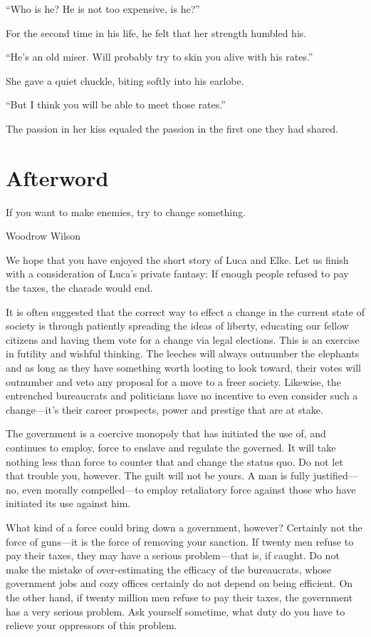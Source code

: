 ``Who is he? He is not too expensive, is he?''

For the second time in his life, he felt that her strength humbled his.

``He's an old miser. Will probably try to skin you alive with his rates.''

She gave a quiet chuckle, biting softly into his earlobe.

``But I think you will be able to meet those rates.''

The passion in her kiss equaled the passion in the first one they had shared.

\chapter*{Afterword}

\epigraph{If you want to make enemies, try to change something.}{Woodrow Wilson}

\firstparagraph

We hope that you have enjoyed the short story of Luca and Elke. Let us finish with a consideration of Luca's private fantasy: If enough people refused to pay the taxes, the charade would end.

It is often suggested that the correct way to effect a change in the current state of society is through patiently spreading the ideas of liberty, educating our fellow citizens and having them vote for a change via legal elections. This is an exercise in futility and wishful thinking. The leeches will always outnumber the elephants and as long as they have something worth looting to look toward, their votes will outnumber and veto any proposal for a move to a freer society. Likewise, the entrenched bureaucrats and politicians have no incentive to even consider such a change---it's their career prospects, power and prestige that are at stake.

The government is a coercive monopoly that has initiated the use of, and continues to employ, force to enslave and regulate the governed. It will take nothing less than force to counter that and change the status quo. Do not let that trouble you, however. The guilt will not be yours. A man is fully justified---no, even morally compelled---to employ retaliatory force against those who have initiated its use against him.

What kind of a force could bring down a government, however? Certainly not the force of guns---it is the force of removing your sanction. If twenty men refuse to pay their taxes, they may have a serious problem---that is, if caught. Do not make the mistake of over-estimating the efficacy of the bureaucrats, whose government jobs and cozy offices certainly do not depend on being efficient. On the other hand, if twenty million men refuse to pay their taxes, the government has a very serious problem. Ask yourself sometime, what duty do you have to relieve your oppressors of this problem.

